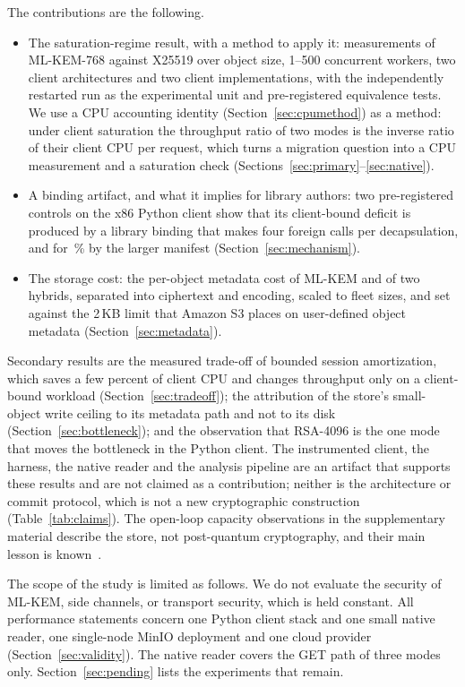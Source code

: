 \documentclass[review,12pt]{elsarticle}
\begin{document}
The contributions are the following.
\begin{itemize}
\item[C1] The saturation-regime result, with a method to apply it: measurements
of ML-KEM-768 against X25519 over object size, 1--500 concurrent workers, two client
architectures and two client implementations, with the independently restarted run as the
experimental unit and pre-registered equivalence tests. We use a CPU accounting identity
(Section~\ref{sec:cpumethod}) as a method: under client saturation the throughput ratio of two
modes is the inverse ratio of their client CPU per request, which turns a migration question
into a CPU measurement and a saturation check
(Sections~\ref{sec:primary}--\ref{sec:native}).
\item[C2] A binding artifact, and what it implies for library authors: two
pre-registered controls on the x86 Python client show that its client-bound deficit is produced
by a library binding that makes four foreign calls per decapsulation, and for
\AudPadShare\,\% by the larger manifest (Section~\ref{sec:mechanism}).
\item[C3] The storage cost: the per-object metadata cost of ML-KEM and of two
hybrids, separated into ciphertext and encoding, scaled to fleet sizes, and set against the
2\,KB limit that Amazon S3 places on user-defined object metadata
(Section~\ref{sec:metadata}).
\end{itemize}
Secondary results are the measured trade-off of bounded session amortization, which saves a few
percent of client CPU and changes throughput only on a client-bound workload
(Section~\ref{sec:tradeoff}); the attribution of the store's small-object write ceiling to its
metadata path and not to its disk (Section~\ref{sec:bottleneck}); and the observation that
RSA-4096 is the one mode that moves the bottleneck in the Python client. The instrumented client, the harness, the native reader and the
analysis pipeline are an artifact that supports these results and are not claimed as a
contribution; neither is the architecture or commit protocol, which is not a new cryptographic
construction (Table~\ref{tab:claims}). The open-loop capacity observations in the supplementary
material describe the store, not post-quantum cryptography, and their main lesson is
known~\cite{schroeder2006}.

The scope of the study is limited as follows. We do not evaluate the security of ML-KEM, side channels, or transport security,
which is held constant. All performance statements concern one Python client stack and one small native reader, one
single-node MinIO deployment and one cloud provider (Section~\ref{sec:validity}). The native
reader covers the GET path of three modes only. Section~\ref{sec:pending} lists the experiments
that remain.
\end{document}
